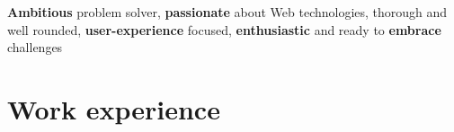 \vspace{-0.5cm}
{\textbf{Ambitious} problem solver, \textbf{passionate} about Web technologies, thorough and well rounded, \textbf{user-experience} focused, \textbf{enthusiastic} and ready to \textbf{embrace} challenges}

\vspace{-.04cm}
\section{\normalfont Work experience}
\vspace{-.1cm}
